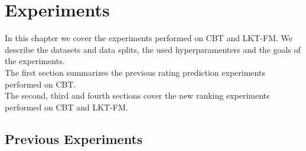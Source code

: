 \chapter{Experiments}
\label{ch:experiments}

In this chapter we cover the experiments performed on CBT and LKT-FM. We describe the datasets and data splits, the used hyperparamenters and the goals of the experiments.\\
The first section summarizes the previous rating prediction experiments performed on CBT.\\
The second, third and fourth sections cover the new ranking experiments performed on CBT and LKT-FM.



\section{Previous Experiments}

